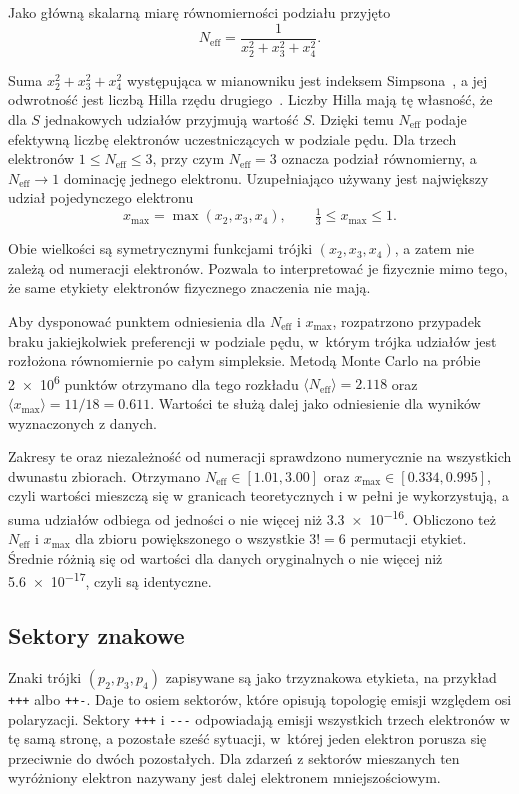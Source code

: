 \documentclass[12pt,a4paper]{article}
\newcommand{\Neff}{N_{\mathrm{eff}}}
\newcommand{\xmax}{x_{\max}}
\begin{document}
Jako główną skalarną miarę równomierności podziału
przyjęto
\begin{equation}
\Neff=\frac{1}{x_2^2+x_3^2+x_4^2}.
\label{eq:Neff}
\end{equation}

Suma $x_2^2+x_3^2+x_4^2$ występująca w mianowniku jest indeksem
Simpsona~\cite{Simpson1949}, a jej odwrotność jest liczbą Hilla rzędu
drugiego~\cite{Hill1973}. Liczby Hilla mają tę własność, że dla $S$
jednakowych udziałów przyjmują wartość $S$. Dzięki temu $\Neff$  podaje
efektywną liczbę elektronów uczestniczących w podziale pędu.
Dla trzech elektronów $1\le\Neff\le3$, przy czym $\Neff=3$ oznacza podział
równomierny, a $\Neff\to1$ dominację jednego elektronu. Uzupełniająco
używany jest największy udział pojedynczego elektronu
\begin{equation}
\xmax=\max(x_2,x_3,x_4),\qquad \tfrac13\le\xmax\le1 .
\label{eq:xmax}
\end{equation}

Obie wielkości są symetrycznymi funkcjami trójki $(x_2,x_3,x_4)$, a
zatem nie zależą od numeracji elektronów. Pozwala to interpretować je
fizycznie mimo tego, że same etykiety elektronów fizycznego znaczenia nie
mają.

Aby dysponować punktem odniesienia dla $\Neff$ i $\xmax$, rozpatrzono
przypadek braku jakiejkolwiek preferencji w podziale pędu, w~którym
trójka udziałów jest rozłożona równomiernie po całym simpleksie.
Metodą Monte Carlo na próbie \num{2e6} punktów otrzymano dla tego
rozkładu $\langle\Neff\rangle=\num{2.118}$ oraz
$\langle\xmax\rangle=11/18=\num{0.611}$. Wartości te służą dalej jako
odniesienie dla wyników wyznaczonych z danych.

Zakresy te oraz niezależność od numeracji sprawdzono numerycznie na
wszystkich dwunastu zbiorach. Otrzymano $\Neff\in[\num{1.01},\num{3.00}]$
oraz $\xmax\in[\num{0.334},\num{0.995}]$, czyli wartości mieszczą się
w granicach teoretycznych i w pełni je wykorzystują, a suma udziałów
odbiega od jedności o nie więcej niż \num{3.3e-16}. Obliczono też
$\Neff$ i $\xmax$ dla zbioru powiększonego o wszystkie $3!=6$ permutacji
etykiet. Średnie różnią się od wartości dla danych oryginalnych o nie
więcej niż \num{5.6e-17}, czyli są identyczne.

\subsection{Sektory znakowe}
\label{sec:sektory}

Znaki trójki $(p_2,p_3,p_4)$ zapisywane są jako trzyznakowa etykieta,
na przykład \texttt{+++} albo \texttt{++-}. Daje to osiem sektorów, które
opisują topologię emisji względem osi polaryzacji. Sektory
\texttt{+++} i \texttt{-{}-{}-} odpowiadają emisji wszystkich trzech
elektronów w tę samą stronę, a pozostałe sześć sytuacji,
w~której jeden elektron porusza się przeciwnie do dwóch pozostałych.
Dla zdarzeń z sektorów mieszanych ten wyróżniony elektron nazywany jest
dalej elektronem mniejszościowym.
\end{document}
